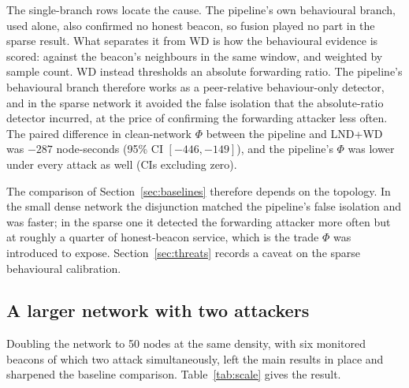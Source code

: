 The single-branch rows locate the cause. The pipeline's own behavioural
branch, used alone, also confirmed no honest beacon, so fusion played no part
in the sparse result. What separates it from WD is how the behavioural
evidence is scored: against the beacon's neighbours in the same window, and
weighted by sample count. WD instead thresholds an absolute forwarding ratio.
The pipeline's behavioural branch therefore works as a peer-relative
behaviour-only detector, and in the sparse network it avoided the false isolation that the
absolute-ratio detector incurred, at the price of confirming the forwarding
attacker less often. The paired difference in clean-network $\Phi$ between the pipeline and LND+WD
was $-287$ node-seconds (95\% CI $[-446, -149]$), and the pipeline's $\Phi$
was lower under every attack as well (CIs excluding zero).

The comparison of Section~\ref{sec:baselines} therefore depends on the
topology. In the small dense network the disjunction matched the pipeline's
false isolation and was faster; in the sparse one it detected the forwarding
attacker more often but at roughly a quarter of honest-beacon service, which
is the trade $\Phi$ was introduced to expose. Section~\ref{sec:threats}
records a caveat on the sparse behavioural calibration.

\subsection{A larger network with two attackers}
\label{sec:scale}

Doubling the network to 50 nodes at the same density, with six monitored
beacons of which two attack simultaneously, left the main results in place
and sharpened the baseline comparison. Table~\ref{tab:scale} gives the
result.

